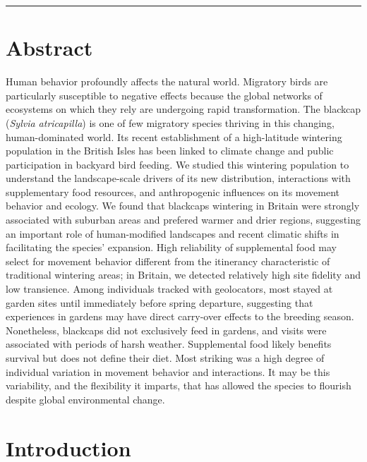 \documentclass[a4paper, twoside]{templates/ociamthesis}
\begin{document}
\minitoc 

\begin{center}\rule{0.5\linewidth}{\linethickness}\end{center}

\hypertarget{abstract}{%
\section{Abstract}\label{abstract}}

Human behavior profoundly affects the natural world. Migratory birds are particularly susceptible to negative effects because the global networks of ecosystems on which they rely are undergoing rapid transformation. The blackcap (\emph{Sylvia atricapilla}) is one of few migratory species thriving in this changing, human-dominated world. Its recent establishment of a high-latitude wintering population in the British Isles has been linked to climate change and public participation in backyard bird feeding. We studied this wintering population to understand the landscape-scale drivers of its new distribution, interactions with supplementary food resources, and anthropogenic influences on its movement behavior and ecology. We found that blackcaps wintering in Britain were strongly associated with suburban areas and prefered warmer and drier regions, suggesting an important role of human-modified landscapes and recent climatic shifts in facilitating the species' expansion. High reliability of supplemental food may select for movement behavior different from the itinerancy characteristic of traditional wintering areas; in Britain, we detected relatively high site fidelity and low transience. Among individuals tracked with geolocators, most stayed at garden sites until immediately before spring departure, suggesting that experiences in gardens may have direct carry-over effects to the breeding season. Nonetheless, blackcaps did not exclusively feed in gardens, and visits were associated with periods of harsh weather. Supplemental food likely benefits survival but does not define their diet. Most striking was a high degree of individual variation in movement behavior and interactions. It may be this variability, and the flexibility it imparts, that has allowed the species to flourish despite global environmental change.

\hypertarget{introduction-1}{%
\section{Introduction}\label{introduction-1}}
\end{document}

